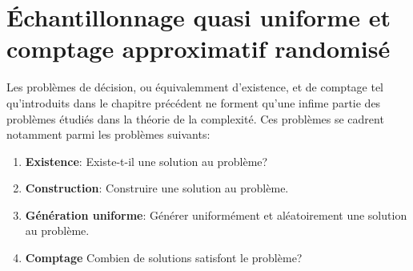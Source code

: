 \chapter{Échantillonnage quasi uniforme et comptage approximatif randomisé}
\label{cha:echantillonnage-quasi-uniforme-comptage-approximatif-randomise}

Les problèmes de décision, ou équivalemment d'existence, et de comptage tel qu'introduits dans le chapitre précédent ne forment qu'une infime partie des problèmes étudiés dans la théorie de la complexité. Ces problèmes se cadrent notamment parmi les problèmes suivants:

\begin{enumerate}[(1)]
    \item \textbf{Existence}: Existe-t-il une solution au problème?
    \item \textbf{Construction}: Construire une solution au problème.
    \item \textbf{Génération uniforme}: Générer uniformément et aléatoirement une solution au problème.
    \item \textbf{Comptage} Combien de solutions satisfont le problème?
\end{enumerate}

